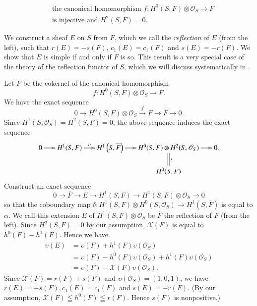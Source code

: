 \setcounter{equation}{20}
\begin{equation}\label{eqn2.21}
\begin{aligned}
&\text{ the canonical homomorphism }
f:H^{0}(S,F)\otimes \mathscr{O}_S\to F\\ 
&{}\text{ is injective and }
H^{2}(S,F)=0.
\end{aligned}
\end{equation}

We construct a sheaf $E$ on $S$ from $F$, which we call
the \textit{reflection} of $E$ (from the left), such that
$r(E)=-s(F)$, $c_1(E)=c_1(F)$ and $s(E)=-r(F)$. We show that $E$ is
simple if and only if $F$ is so. This result is a very special case of
the theory of the reflection functor of $S$, which we will discuss
systematically in \cite{key14}.


Let $\overline{F}$ be the cokernel of the canonical homomorphism
$$
f:H^{0}(S,F)\otimes \mathscr{O}_S\to F.
$$ 
We have the exact sequence 
\begin{equation}\label{eqn2.22}
0\to H^{0}(S,F)\otimes \mathscr{O}_S\xrightarrow{f}
F\to \overline{F}\to 0.
\end{equation}
Since $H^{1}(S,\mathscr{O}_S)=H^{2}(S,F)=0$, the above sequence
induces the exact sequence
\begin{equation}\label{eqn2.23}
\xymatrix@=.55cm{0\ar[r]&H^{1}(S,F)\ar[r]^{\alpha}&H^{1}\left(S,\overline{F}\right)\ar[r]&
H^{0}(S,F)\otimes\ar@{=}[d]^{\wr} H^{2}(S,\mathscr{O}_S)\ar[r]&0.\\
&&&H^{0}(S,F)&}
\end{equation}\pageoriginale
Construct an exact sequence
\begin{equation}\label{eqn2.24}
0\to \overline{F}\to E\to H^{1}(S,F)\to
H^{1}(S,F)\otimes \mathscr{O}_S\to 0
\end{equation}
so that the coboundary map $\delta:H^{1}(S,F)\otimes
H^{0}(S,\mathscr{O}_S)\to H^{1}(S,\overline{F})$ is equal to
$\alpha$. We call this extension $E$ of
$H^{1}(S,F)\otimes \mathscr{O}_S$ be $\overline{F}$ the reflection of
$F$ (from the left). Since $H^{2}(S,F)=0$ by our assumption,
$\mathcal{X}(F)$ is equal to $h^{0}(F)-h^{1}(F)$. Hence we have.
$$
\begin{aligned}
\upsilon(E)&=\upsilon(F)+h^{1}(F)\upsilon(\mathscr{O}_S)\\
&{}=\upsilon(F)-h^{0}(F)\upsilon(\mathscr{O}_S)+h^{1}(F)\upsilon(\mathscr{O}_S)\\
&{}=\upsilon(F)-\mathcal{X}(F)\upsilon(\mathscr{O}_S).
\end{aligned}
$$
Since $\mathcal{X}(F)=r(F)+s(F)$ and
$\upsilon(\mathscr{O}_S)=(1,0,1)$, we have $r(E)=-s(F),c_1(E)=c_1(F)$
and $s(E)=-r(F)$. (By our assumption, $\mathcal{X}(F)\leqq
h^{0}(F)\leqq r(F)$. Hence $s(F)$ is nonpositive.)

